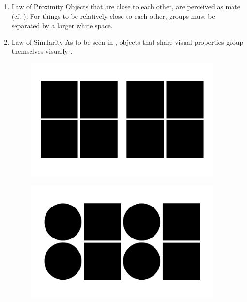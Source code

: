 \begin{enumerate}
    \item{Law of Proximity} Objects that are close to each other, are perceived as mate (cf. ). For things to be relatively close to each other, groups must be separated by a larger white space. \parencite{Seogaard.n.y.}
    \item{Law of Similarity} As to be seen in , objects that share visual properties group themselves visually \parencite[cf.][2]{Bakar.2017}.
    \begin{figure}[H] 
        \begin{minipage}[b]{.5\linewidth}
            \centering\includegraphics[width=0.94\textwidth]{img/proximity.pdf}
            \label{fig:prox}
        \end{minipage}%
        \begin{minipage}[b]{.5\linewidth}
            \centering\includegraphics[width=0.94\textwidth]{img/similarity.pdf}
            \label{fig:sim}
        \end{minipage}

\end{figure}
\end{enumerate}
